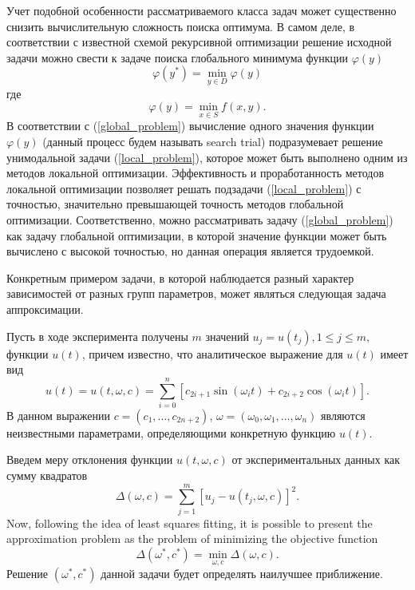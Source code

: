 \documentclass{svproc}
\begin{document}
Учет подобной особенности рассматриваемого класса задач может существенно снизить вычислительную сложность поиска оптимума. В самом деле, в соответствии с известной схемой рекурсивной оптимизации \cite{Carr} решение исходной задачи можно свести к задаче поиска глобального минимума функции $\varphi(y)$
\begin{equation}\label{global_problem}
\varphi(y^*) = \min_{y\in D}  \varphi (y)
\end{equation}
где 
\begin{equation}\label{local_problem}
\varphi(y) = \min_{x\in S} f(x,y).
\end{equation}
В соответствии с (\ref{global_problem}) вычисление одного значения функции $\varphi (y)$ (данный процесс будем называть search trial) подразумевает решение унимодальной задачи (\ref{local_problem}), которое может быть выполнено одним из методов локальной оптимизации. Эффективность и проработанность методов локальной оптимизации позволяет решать подзадачи (\ref{local_problem}) с точностью, значительно превышающей точность методов глобальной оптимизации. Соответственно, можно рассматривать задачу (\ref{global_problem}) как задачу глобальной оптимизации, в которой значение функции может быть вычислено с высокой точностью, но данная операция является трудоемкой. 

Конкретным примером задачи, в которой наблюдается разный характер зависимостей от разных групп параметров, может являться следующая задача аппроксимации.

Пусть в ходе эксперимента получены $m$ значений $u_j = u(t_j), 1 \leq j \leq m, $ функции $u(t)$, причем известно, что аналитическое выражение для  $u(t)$ имеет вид
\begin{equation}\label{ex_func}
u(t) = u(t,\omega,c)=\sum^{n}_{i=0}\left[c_{2i+1}\sin(\omega_it) + c_{2i+2}\cos(\omega_it)\right].	
\end{equation}
В данном выражении $c=\left(c_1,\ldots,c_{2n+2}\right)$, $\omega=\left(\omega_0,\omega_1,\ldots,\omega_n\right)$ являются неизвестными параметрами, определяющими конкретную функцию $u(t)$.

Введем меру отклонения функции $u(t,\omega,c)$ от экспериментальных данных как сумму квадратов
\[
\Delta(\omega,c)= \sum^{m}_{j=1}\left[u_j-u(t_j,\omega,c)\right]^2. 
\]
Now, following the idea of least squares fitting, it is possible to present the approximation problem as the problem of minimizing the objective function
\begin{equation}\label{ex_prob}
\Delta(\omega^*,c^*) = \min_{\omega,c} \Delta(\omega,c).	
\end{equation}
Решение $(\omega^*,c^*)$ данной задачи будет определять наилучшее приближение.
\end{document}
